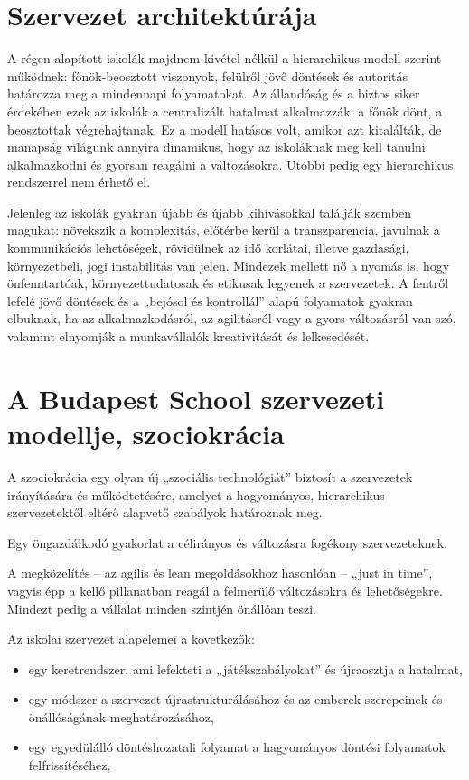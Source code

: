 \section{Szervezet architektúrája}


A régen alapított iskolák majdnem kivétel nélkül a hierarchikus modell szerint működnek: főnök-beosztott viszonyok, felülről jövő döntések és autoritás határozza meg a mindennapi folyamatokat. Az állandóság és a biztos siker érdekében ezek az iskolák a centralizált hatalmat alkalmazzák: a főnök dönt, a beosztottak végrehajtanak. Ez a modell hatásos volt, amikor azt kitalálták, de manapság világunk annyira dinamikus, hogy az iskoláknak meg kell tanulni alkalmazkodni és gyorsan reagálni a változásokra. Utóbbi pedig egy hierarchikus rendszerrel nem érhető el.

Jelenleg az iskolák gyakran újabb és újabb kihívásokkal találják szemben magukat: növekszik a komplexitás, előtérbe kerül a transzparencia, javulnak a kommunikációs lehetőségek, rövidülnek az idő korlátai, illetve gazdasági, környezetbeli, jogi instabilitás van jelen. Mindezek mellett nő a nyomás is, hogy önfenntartóak, környezettudatosak és etikusak legyenek a szervezetek. A fentről lefelé jövő döntések és a „bejósol és kontrollál” alapú folyamatok gyakran elbuknak, ha az alkalmazkodásról, az agilitásról vagy a gyors változásról van szó, valamint elnyomják a munkavállalók kreativitását és lelkesedését. 

\section{A Budapest School szervezeti modellje, szociokrácia}

A szociokrácia egy olyan új „szociális technológiát” biztosít a szervezetek irányítására és működtetésére, amelyet a hagyományos, hierarchikus szervezetektől eltérő alapvető szabályok határoznak meg.

Egy öngazdálkodó gyakorlat a célirányos és változásra fogékony szervezeteknek.

A megközelítés – az agilis és lean megoldásokhoz hasonlóan – „just in time”, vagyis épp a kellő pillanatban reagál a felmerülő változásokra és lehetőségekre. Mindezt pedig a vállalat minden szintjén önállóan teszi.

Az iskolai szervezet alapelemei a következők:
\begin{itemize}
    \item egy keretrendszer, ami lefekteti a „játékszabályokat” és újraosztja a hatalmat,
    \item egy módszer a szervezet újrastrukturálásához és az emberek szerepeinek és önállóságának meghatározásához,
    \item egy egyedülálló döntéshozatali folyamat a hagyományos döntési folyamatok felfrissítéséhez,
\end{itemize}

